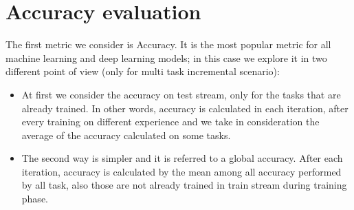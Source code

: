 \documentclass[english, LaM, oneside]{sapthesis}%
\begin{document}
\section{Accuracy evaluation}
The first metric we consider is Accuracy. It is the most popular metric for all machine learning and deep learning models; in this case we explore it in two different point of view (only for multi task incremental scenario):
\begin{itemize}
    \item At first we consider the accuracy on test stream, only for the tasks that are already trained. In other words, accuracy is calculated in each iteration, after every training on different experience and we take in consideration the average of the accuracy calculated on some tasks.
    \item The second way is simpler and it is referred to a global accuracy. After each iteration, accuracy is calculated by the mean among all accuracy performed by all task, also those are not already trained in train stream during training phase.
\end{itemize}
\end{document}
